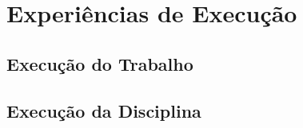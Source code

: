 \chapter[Experiências de Execução]{Experiências de Execução}

\section{Execução do Trabalho}

\section{Execução da Disciplina}